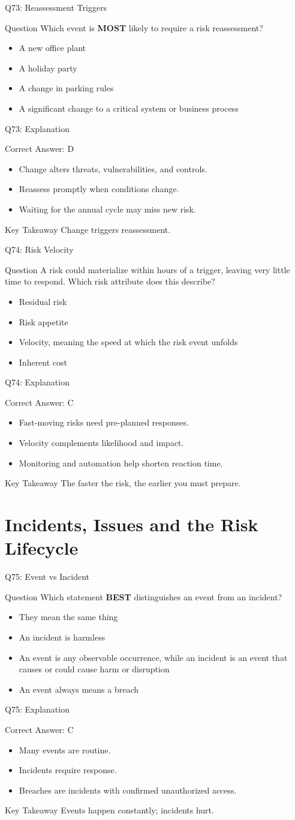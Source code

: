 \documentclass[aspectratio=169]{beamer}
\newcommand{\hq}[7]{%
	\begin{frame}{Q#1: #2}
		\begin{block}{Question}
			#3
		\end{block}
		\begin{itemize}
			#4
		\end{itemize}
	\end{frame}
	\begin{frame}{Q#1: Explanation}
		\begin{block}{Correct Answer: #5}
			\begin{itemize}
				#6
			\end{itemize}
		\end{block}
		\begin{alertblock}{Key Takeaway}
			#7
		\end{alertblock}
	\end{frame}
}
\begin{document}
	\hq{73}{Reassessment Triggers}
	{Which event is \textbf{MOST} likely to require a risk reassessment?}
	{\item[\textbf{(A)}] A new office plant
		\item[\textbf{(B)}] A holiday party
		\item[\textbf{(C)}] A change in parking rules
		\item[\textbf{(D)}] A significant change to a critical system or business process}
	{D}
	{\item Change alters threats, vulnerabilities, and controls.
		\item Reassess promptly when conditions change.
		\item Waiting for the annual cycle may miss new risk.}
	{Change triggers reassessment.}
	
	\hq{74}{Risk Velocity}
	{A risk could materialize within hours of a trigger, leaving very little time to respond. Which risk attribute does this describe?}
	{\item[\textbf{(A)}] Residual risk
		\item[\textbf{(B)}] Risk appetite
		\item[\textbf{(C)}] Velocity, meaning the speed at which the risk event unfolds
		\item[\textbf{(D)}] Inherent cost}
	{C}
	{\item Fast-moving risks need pre-planned responses.
		\item Velocity complements likelihood and impact.
		\item Monitoring and automation help shorten reaction time.}
	{The faster the risk, the earlier you must prepare.}
	
	\section{Incidents, Issues and the Risk Lifecycle}
	
	\hq{75}{Event vs Incident}
	{Which statement \textbf{BEST} distinguishes an event from an incident?}
	{\item[\textbf{(A)}] They mean the same thing
		\item[\textbf{(B)}] An incident is harmless
		\item[\textbf{(C)}] An event is any observable occurrence, while an incident is an event that causes or could cause harm or disruption
		\item[\textbf{(D)}] An event always means a breach}
	{C}
	{\item Many events are routine.
		\item Incidents require response.
		\item Breaches are incidents with confirmed unauthorized access.}
	{Events happen constantly; incidents hurt.}
	
\end{document}
